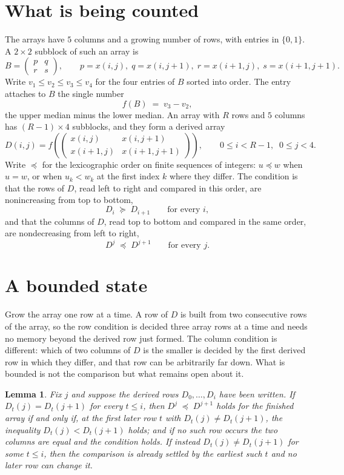 \documentclass[11pt,a4paper]{article}
\theoremstyle{plain}
\newtheorem{lemma}[theorem]{Lemma}
\theoremstyle{definition}
\begin{document}
\section{What is being counted}

The arrays have $5$ columns and a growing number of rows, with entries in $\{0,1\}$. A
$2\times2$ subblock of such an array is
\[
B=\begin{pmatrix} p & q \\ r & s \end{pmatrix},
\qquad p=x(i,j),\; q=x(i,j+1),\; r=x(i+1,j),\; s=x(i+1,j+1).
\]
Write $v_1\le v_2\le v_3\le v_4$ for the four entries of $B$ sorted into order. The entry attaches to $B$ the single number
\[
f(B)\;=\;v_3-v_2,
\]
the upper median minus the lower median. An array with $R$ rows and $5$ columns has $(R-1)\times4$ subblocks, and they
form a derived array
\[
D(i,j)=f\!\left(\begin{pmatrix} x(i,j) & x(i,j+1) \\ x(i+1,j) & x(i+1,j+1)\end{pmatrix}
\right),\qquad 0\le i<R-1,\;\; 0\le j<4 .
\]
Write $\preceq$ for the lexicographic order on finite sequences of integers: $u\preceq w$ when
$u=w$, or when $u_k<w_k$ at the first index $k$ where they differ. The condition is that the
rows of $D$, read left to right and compared in this order, are nonincreasing from top to bottom,
\[
D_{i}\;\succeq\;D_{i+1}\qquad\text{for every } i,
\]
and that the columns of $D$, read top to bottom and compared in the same order, are nondecreasing
from left to right,
\[
D^{j}\;\preceq\;D^{j+1}\qquad\text{for every } j .
\]

\section{A bounded state}

Grow the array one row at a time. A row of $D$ is built from two consecutive rows of the array,
so the row condition is decided three array rows at a time and needs no memory beyond the
derived row just formed. The column condition is different: which of two columns of $D$ is the
smaller is decided by the first derived row in which they differ, and that row can be
arbitrarily far down. What is bounded is not the comparison but what remains open about it.

\begin{lemma}\label{lem:bits}
Fix $j$ and suppose the derived rows $D_0,\dots,D_i$ have been written. If $D_t(j)=D_t(j+1)$ for
every $t\le i$, then $D^{j}\;\preceq\;D^{j+1}$ holds for the finished array if and only if,
at the first later row $t$ with $D_t(j)\neq D_t(j+1)$, the inequality $D_t(j)<D_t(j+1)$
holds; and if no such row occurs the two columns are equal and the condition holds. If instead
$D_t(j)\neq D_t(j+1)$ for some $t\le i$, then the comparison is already settled by the earliest
such $t$ and no later row can change it.
\end{lemma}
\end{document}
